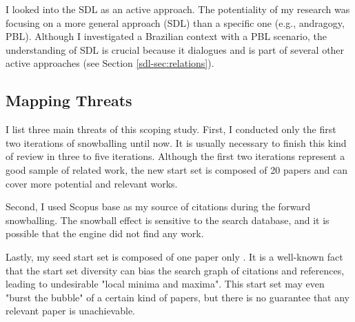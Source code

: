 I looked into the \gls{SDL} as an active approach. The potentiality of my research was focusing on a more general approach (\gls{SDL}) than a specific one (e.g., andragogy, \gls{PBL}). Although I investigated a Brazilian context with a \gls{PBL} scenario,  the understanding of \gls{SDL} is crucial because it dialogues and is part of several other active approaches (see Section \ref{sdl-sec:relations}).

\subsection{Mapping Threats}
\label{rel-work-sum-ss:threats}

I list three main threats of this scoping study. First, I conducted only the first two iterations of snowballing until now. It is usually necessary to finish this kind of review in three to five iterations. Although the first two iterations represent a good sample of related work, the new start set is composed of 20 papers and can cover more potential and relevant works.

Second, I used Scopus base as my source of citations during the forward snowballing. The snowball effect is sensitive to the search database, and it is possible that the engine did not find any work.

Lastly, my seed start set is composed of one paper only \cite{lewis:2015}. It is a well-known fact that the start set diversity can bias the search graph of citations and references, leading to undesirable "local minima and maxima". This start set may even "burst the bubble" of a certain kind of papers, but there is no guarantee that any relevant paper is unachievable.
